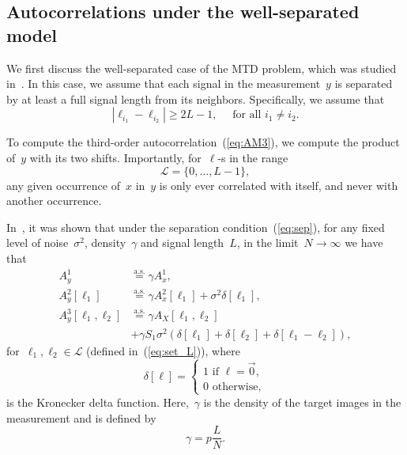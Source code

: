 \documentclass{article}
\begin{document}
\subsection{Autocorrelations under the well-separated model}
\label{subsec:relations}
We first discuss the \mbox{well-separated} case of the MTD problem, which was studied in~\cite{bendory2019multi}. In this case, we assume that each signal in the measurement~$y$ is separated by at least a full signal length from its neighbors. Specifically, we assume that
\begin{equation}
\label{eq:sep}
|\ell_{i_1} - \ell_{i_2}| \ge 2L - 1, \quad \text{ for all } i_1 \ne i_2.
\end{equation}

To compute the third-order autocorrelation~(\ref{eq:AM3}), we compute the product of~$y$ with its two shifts. Importantly, for~\mbox{$\ell$-s} in the range
\begin{equation}
\label{eq:set_L}
\mathcal{L} = \{0, \ldots, {L - 1}\},
\end{equation}
any given occurrence of~$x$ in~$y$ is only ever correlated with itself, and never with another occurrence.

In~\cite{bendory2019multi}, it was shown that under the separation condition~(\ref{eq:sep}), for any fixed level of noise~$\sigma^2$, density~$\gamma$ and signal length~$L$, in the limit~\mbox{$N \rightarrow \infty$} we have that
\begin{align}
\label{eq:well_separated_1st}
A_{y}^1 &\stackrel{\text{a.s.}}{=} \gamma A_{x}^1, \\
\label{eq:well_separated_2nd}
A_{y}^2 [\ell_1] &\stackrel{\text{a.s.}}{=} \gamma A_{x}^2 [\ell_1] + \sigma^2\delta[\ell_1], \\
\label{eq:well_separated_3rd}
A_{y}^3 [\ell_1, \ell_2] &\stackrel{\text{a.s.}}{=} \gamma A_{X} [\ell_1, \ell_2] \nonumber \\&+ \gamma S_1 \sigma^2 (\delta[\ell_1] + \delta[\ell_2] + \delta[\ell_1 - \ell_2]),
\end{align}
for~$\ell_1, \ell_2 \in \mathcal{L}$ (defined in~(\ref{eq:set_L})), where
\begin{equation}
\label{eq:delta}
\delta[\ell] = \begin{cases} 1 \text{ if } \ell = \vec{0}, \\ 0 \text{ otherwise}, \end{cases}
\end{equation}
is the Kronecker delta function. Here,~$\gamma$ is the density of the target images in the measurement and is defined by
\begin{equation}
\label{eq:gamma}
\gamma = p \frac{L}{N}.
\end{equation}
\end{document}
